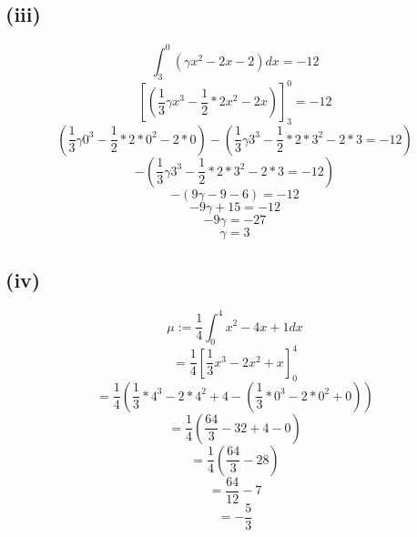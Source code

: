 \documentclass{article}
\begin{document}
\subsection*{(iii)}
\[\int_3^0{(\gamma x^2-2x-2) dx}=-12\]
\[[(\frac{1}{3}\gamma x^3-\frac{1}{2}*2x^2-2x)]_3^0 = -12\]
\[(\frac{1}{3}\gamma 0^3-\frac{1}{2}*2*0^2-2*0)-(\frac{1}{3}\gamma 3^3-\frac{1}{2}*2*3^2-2*3=-12)\]
\[-(\frac{1}{3}\gamma 3^3-\frac{1}{2}*2*3^2-2*3=-12)\]
\[-(9\gamma -9-6)=-12\]
\[-9\gamma +15=-12\]
\[-9\gamma=-27\]
\[\gamma=3\]

\subsection*{(iv)}
\[\mu:=\frac{1}{4}\int_0^4{x^2-4x+1 dx}\]
\[=\frac{1}{4}[\frac{1}{3}x^3-2x^2+x]_0^4\]
\[=\frac{1}{4}(\frac{1}{3}*4^3-2*4^2+4-(\frac{1}{3}*0^3-2*0^2+0))\]
\[=\frac{1}{4}(\frac{64}{3}-32+4-0)\]
\[=\frac{1}{4}(\frac{64}{3}-28)\]
\[=\frac{64}{12}-7\]
\[= -\frac{5}{3}\]
\end{document}
